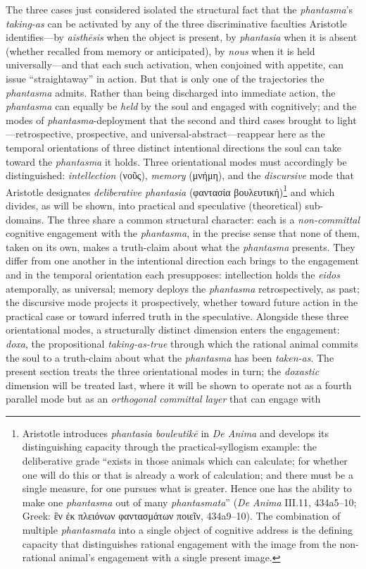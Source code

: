 \documentclass{article}
\newcommand{\gk}[1]{{\greekfont #1}}
\begin{document}
The three cases just considered isolated the structural fact that the \textit{phantasma}'s \textit{taking-as} can be activated by any of the three discriminative faculties Aristotle identifies---by \textit{aisthēsis} when the object is present, by \textit{phantasia} when it is absent (whether recalled from memory or anticipated), by \textit{nous} when it is held universally---and that each such activation, when conjoined with appetite, can issue ``straightaway'' in action. But that is only one of the trajectories the \textit{phantasma} admits. Rather than being discharged into immediate action, the \textit{phantasma} can equally be \textit{held} by the soul and engaged with cognitively; and the modes of \textit{phantasma}-deployment that the second and third cases brought to light---retrospective, prospective, and universal-abstract---reappear here as the temporal orientations of three distinct intentional directions the soul can take toward the \textit{phantasma} it holds. Three orientational modes must accordingly be distinguished: \textit{intellection} (\gk{νοῦς}), \textit{memory} (\gk{μνήμη}), and the \textit{discursive} mode that Aristotle designates \textit{deliberative phantasia} (\gk{φαντασία βουλευτική})\footnote{Aristotle introduces \textit{phantasia bouleutik\=e} in \textit{De Anima} and develops its distinguishing capacity through the practical-syllogism example: the deliberative grade ``exists in those animals which can calculate; for whether one will do this or that is already a work of calculation; and there must be a single measure, for one pursues what is greater. Hence one has the ability to make one \textit{phantasma} out of many \textit{phantasmata}'' (\textit{De Anima} III.11, 434a5--10; Greek: \gk{ἓν ἐκ πλειόνων φαντασμάτων ποιεῖν}, 434a9--10). The combination of multiple \textit{phantasmata} into a single object of cognitive address is the defining capacity that distinguishes rational engagement with the image from the non-rational animal's engagement with a single present image.} and which divides, as will be shown, into practical and speculative (theoretical) sub-domains. The three share a common structural character: each is a \textit{non-committal} cognitive engagement with the \textit{phantasma}, in the precise sense that none of them, taken on its own, makes a truth-claim about what the \textit{phantasma} presents. They differ from one another in the intentional direction each brings to the engagement and in the temporal orientation each presupposes: intellection holds the \textit{eidos} atemporally, as universal; memory deploys the \textit{phantasma} retrospectively, as past; the discursive mode projects it prospectively, whether toward future action in the practical case or toward inferred truth in the speculative. Alongside these three orientational modes, a structurally distinct dimension enters the engagement: \textit{doxa}, the propositional \textit{taking-as-true} through which the rational animal commits the soul to a truth-claim about what the \textit{phantasma} has been \textit{taken-as}. The present section treats the three orientational modes in turn; the \textit{doxastic} dimension will be treated last, where it will be shown to operate not as a fourth parallel mode but as an \textit{orthogonal committal layer} that can engage with 
\end{document}
